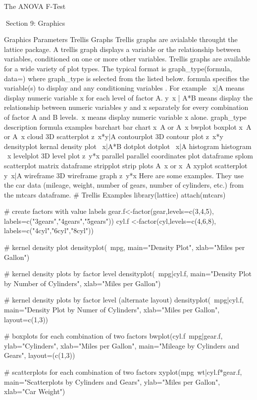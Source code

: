 \begin{frame}
\begin{frame}
The ANOVA F-Test

 
Section 9: Graphics


Graphics Parameters
Trellis Graphs
Trellis graphs are avialable throught the lattice package. A trellis graph displays a variable or the relationship between variables, conditioned on one or more other variables. Trellis graphs are available for a wide variety of plot types.
The typical format is
graph_type(formula, data=)
where graph_type is selected from the listed below. formula specifies the variable(s) to display and any conditioning variables . For example ~x|A means display numeric variable x for each level of factor A. y~x | A*B means display the relationship between numeric variables y and x separately for every combination of factor A and B levels.~x means display numeric variable x alone.
graph_type
description
formula examples
barchart
bar chart
x~A or A~x
bwplot
boxplot
x~A or A~x
cloud
3D scatterplot
z~x*y|A
contourplot
3D contour plot
z~x*y
densityplot
kernal density plot
~x|A*B
dotplot
dotplot
~x|A
histogram
histogram
~x
levelplot
3D level plot
z~y*x
parallel
parallel coordinates plot
dataframe
splom
scatterplot matrix
dataframe
stripplot
strip plots
A~x or x~A
xyplot
scatterplot
y~x|A
wireframe
3D wireframe graph
z~y*x
Here are some examples. They use the car data (mileage, weight, number of gears, number of cylinders, etc.) from the mtcars dataframe.
# Trellis Examples 
library(lattice) 
attach(mtcars)

# create factors with value labels 
gear.f<-factor(gear,levels=c(3,4,5),
   labels=c("3gears","4gears","5gears")) 
cyl.f <-factor(cyl,levels=c(4,6,8),
   labels=c("4cyl","6cyl","8cyl")) 

# kernel density plot 
densityplot(~mpg, 
   main="Density Plot", 
   xlab="Miles per Gallon")

# kernel density plots by factor level 
densityplot(~mpg|cyl.f, 
   main="Density Plot by Number of Cylinders",
   xlab="Miles per Gallon")

# kernel density plots by factor level (alternate layout) 
densityplot(~mpg|cyl.f, 
   main="Density Plot by Numer of Cylinders",
   xlab="Miles per Gallon", 
   layout=c(1,3))

# boxplots for each combination of two factors 
bwplot(cyl.f~mpg|gear.f,
   ylab="Cylinders", xlab="Miles per Gallon", 
   main="Mileage by Cylinders and Gears", 
   layout=(c(1,3))

# scatterplots for each combination of two factors 
xyplot(mpg~wt|cyl.f*gear.f, 
   main="Scatterplots by Cylinders and Gears", 
   ylab="Miles per Gallon", xlab="Car Weight")


\end{frame}
\end{frame}
